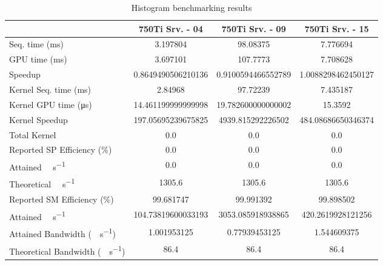 \begin{table}[H]
	\centering
	\caption{Histogram benchmarking results}
	\label{tab:histogram-results}
	\begin{tabular}{lS[table-format=7.1]S[table-format=7.1]S[table-format=7.1]}
		\toprule
			~ & {\textbf{750Ti Srv. - 04}} & {\textbf{750Ti Srv. - 09}} & {\textbf{750Ti Srv. - 15}} \\
		\midrule
			{Seq. time (\si{\milli\second})} & 3.197804 & 98.08375 & 7.776694 \\
			{GPU time (\si{\milli\second})} & 3.697101 & 107.7773 & 7.708628 \\
			{Speedup} & 0.8649490506210136 &0.9100594466552789 & 1.0088298462450127 \\
		\midrule
			{Kernel Seq. time (\si{\milli\second})} & 2.84968 & 97.72239 & 7.435187 \\
			{Kernel GPU time (\si{\micro\second})} & 14.461199999999998 & 19.782600000000002 & 15.3592 \\
			{Kernel Speedup} & 197.05695239675825 & 4939.815292226502 & 484.08686650346374 \\
		\midrule
			{Total Kernel \si{\mega\flops}} & 0.0 & 0.0 & 0.0 \\
			{Reported SP Efficiency (\si{\percent})} & 0.0 & 0.0 & 0.0 \\
			{Attained \si{\giga\flops\per\second}} & 0.0 & 0.0 & 0.0 \\
			{Theoretical \si{\giga\flops\per\second}} & 1305.6 & 1305.6 & 1305.6 \\
		\midrule
			{Reported SM Efficiency (\si{\percent})} & 99.681747 & 99.991392 & 99.898502 \\
			{Attained \si{\giga\iops\per\second}} & 104.73819600033193 & 3053.085918938865 & 420.2619928121256 \\			
		\midrule
			{Attained Bandwidth (\si{\giga\byte\per\second})} & 1.001953125 & 0.77939453125  & 1.544609375 \\
			{Theoretical Bandwidth (\si{\giga\byte\per\second})}	& 86.4 & 86.4 & 86.4 \\
		\bottomrule
	\end{tabular}
\end{table}